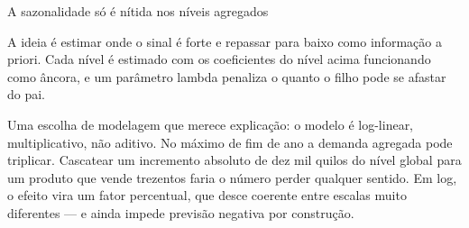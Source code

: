 \documentclass[11pt,aspectratio=169]{beamer}
\begin{document}
\begin{frame}{A sazonalidade só é nítida nos níveis agregados}
{  A ideia é estimar onde o sinal é forte e repassar para baixo como informação a priori. Cada
  nível é estimado com os coeficientes do nível acima funcionando como âncora, e um parâmetro
  lambda penaliza o quanto o filho pode se afastar do pai.

  Uma escolha de modelagem que merece explicação: o modelo é log-linear, multiplicativo, não
  aditivo. No máximo de fim de ano a demanda agregada pode triplicar. Cascatear um incremento
  absoluto de dez mil quilos do nível global para um produto que vende trezentos faria o número
  perder qualquer sentido. Em log, o efeito vira um fator percentual, que desce coerente entre
  escalas muito diferentes — e ainda impede previsão negativa por construção.}
\end{frame}

\end{document}

